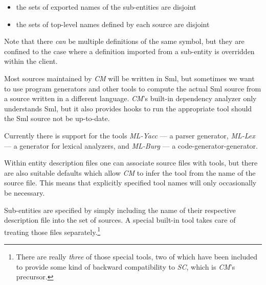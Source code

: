 \begin{itemize}
\item the sets of exported names of the sub-entities are disjoint
\item the sets of top-level names defined by each source are disjoint
\end{itemize}

Note that there {\em can} be multiple definitions of the same symbol, but
they are confined to the case where a definition imported from a sub-entity
is overridden within the client.

Most sources maintained by {\em CM} will be written in {\sc Sml}, but
sometimes we want to use program generators and other tools to compute the
actual {\sc Sml} source from a source written in a different language.
{\em CM}\/'s built-in dependency analyzer only understands {\sc Sml}, but
it also provides hooks to run the appropriate tool should the {\sc Sml}
source not be up-to-date.

Currently there is support for the tools {\em ML-Yacc} --- a parser
generator, {\em ML-Lex} --- a generator for lexical analyzers, and {\em
ML-Burg} --- a code-generator-generator.

Within entity description files one can associate source files with tools,
but there are also suitable defaults which allow {\em CM} to infer the tool
from the name of the source file.  This means that explicitly specified
tool names will only occasionally be necessary.

Sub-entities are specified by simply including the name of their respective
description file into the set of sources.  A special built-in tool takes
care of treating those files separately.\footnote{There are really {\em
three} of those special tools, two of which have been included to provide
some kind of backward compatibility to {\em SC}, which is {\em CM}\/'s
precursor.}


